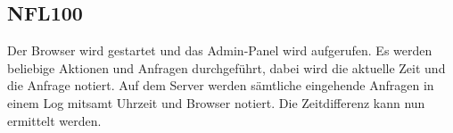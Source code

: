 \subsection*{NFL100}

Der \Gls{Browser} wird gestartet und das \Gls{Admin-Panel} wird aufgerufen.
Es werden beliebige Aktionen und Anfragen durchgeführt, dabei wird die aktuelle Zeit und die Anfrage notiert.
Auf dem Server werden sämtliche eingehende Anfragen in einem \Gls{Log} mitsamt Uhrzeit und \Gls{Browser} notiert.
Die Zeitdifferenz kann nun ermittelt werden.